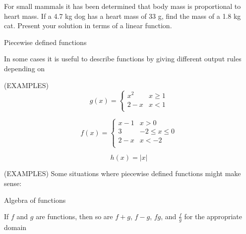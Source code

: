\documentclass[11pt]{article}
\begin{document}
\vspace{1.5in}

For small mammals it has been determined that body mass is proportional to heart mass.  If a 4.7 kg dog has a heart mass of 33 g, find
the mass of a 1.8 kg cat.  Present your solution in terms of a linear function.

\pagebreak

\begin{center}
\Large
\rm{Piecewise defined functions}
\end{center}

In some cases it is useful to describe functions by giving different output rules depending on

(EXAMPLES)\\
  
  \begin{displaymath}
g(x) =   \left\{ \begin{array}{ll}
x^2 & x \ge 1 \\
2-x & x < 1\\
\end{array} \right.
  \end{displaymath}

  \vspace{1.5in}

    \begin{displaymath}
f(x) =   \left\{ \begin{array}{ll}
x-1 & x > 0 \\
3 & -2 \le x \le 0\\
2-x & x < -2 \\
\end{array} \right.
  \end{displaymath}

  \vspace{1.5in}

    \begin{displaymath}
  h(x) = |x|
  \end{displaymath}

    \vspace{1.5in}


  (EXAMPLES) Some situations where piecewise defined functions might make sense:



  \pagebreak

  \begin{center}
\Large
\rm{Algebra of functions}
\end{center}
If $f$ and $g$ are functions, then so are $f+g$, $f-g$, $fg$, and $\frac{f}{g}$ for the appropriate domain
\\
\end{document}
